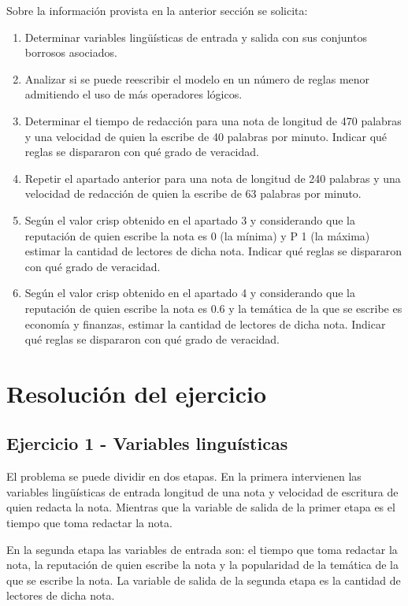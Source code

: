 \documentclass{article}
\begin{document}
\begin{itemize}
Sobre la información provista en la anterior sección se solicita:

\begin{enumerate}
	\item Determinar variables lingüísticas de entrada y salida con sus conjuntos borrosos asociados.
	\item Analizar si se puede reescribir el modelo en un número de reglas menor admitiendo el uso de más operadores lógicos.
	\item Determinar el tiempo de redacción para una nota de longitud de 470 palabras y una velocidad de quien la escribe de 40 palabras por minuto. Indicar qué reglas se dispararon con qué grado de veracidad.
	\item Repetir el apartado anterior para una nota de longitud de 240 palabras y una velocidad de redacción de quien la escribe de 63 palabras por minuto.
	\item Según el valor crisp obtenido en el apartado 3 y considerando que la reputación de quien escribe la nota es 0 (la mínima) y P 1 (la máxima) estimar la cantidad de lectores de dicha nota. Indicar qué reglas se dispararon con qué grado de veracidad.
	\item Según el valor crisp obtenido en el apartado 4 y considerando que la reputación de quien escribe la nota es 0.6 y la temática de la que se escribe es economía y finanzas, estimar la cantidad de lectores de dicha nota. Indicar qué reglas se dispararon con qué grado de veracidad.
\end{enumerate}

\pagebreak
\section*{Resolución del ejercicio}

\subsection*{Ejercicio 1 - Variables linguísticas}
El problema se puede dividir en dos etapas. En la primera intervienen las variables lingüísticas de entrada longitud de una nota y velocidad de escritura de quien redacta la nota. Mientras que la variable de salida de la primer etapa es el tiempo que toma redactar la nota.

\vspace{3mm}
En la segunda etapa las variables de entrada son: el tiempo que toma redactar la nota, la reputación de quien escribe la nota y la popularidad de la temática de la que se escribe la nota. La variable de salida de la segunda etapa es la cantidad de lectores de dicha nota.


\end{itemize}
\end{document}
